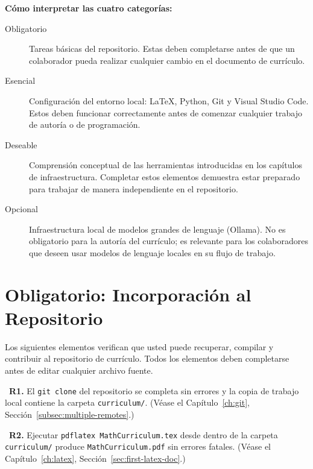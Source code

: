 \begin{Form}
\vs
\noindent
\textbf{Cómo interpretar las cuatro categorías:}

\begin{description}
    \item[Obligatorio] Tareas básicas del repositorio. Estas deben
          completarse antes de que un colaborador pueda realizar
          cualquier cambio en el documento de currículo.
    \item[Esencial] Configuración del entorno local: \LaTeX{}, Python,
          Git y Visual Studio Code. Estos deben funcionar
          correctamente antes de comenzar cualquier trabajo de autoría
          o de programación.
    \item[Deseable] Comprensión conceptual de las herramientas
          introducidas en los capítulos de infraestructura. Completar
          estos elementos demuestra estar preparado para trabajar de
          manera independiente en el repositorio.
    \item[Opcional] Infraestructura local de modelos grandes de
          lenguaje (Ollama). No es obligatorio para la autoría del
          currículo; es relevante para los colaboradores que deseen
          usar modelos de lenguaje locales en su flujo de trabajo.
\end{description}
\vs

\section{Obligatorio: Incorporación al Repositorio}
\label{sec:assess-required}

Los siguientes elementos verifican que usted puede recuperar,
compilar y contribuir al repositorio de currículo. Todos los
elementos deben completarse antes de editar cualquier archivo fuente.

\vs

\noindent\CheckBox[name=r1,width=0.4cm,height=0.4cm]{}~\textbf{R1.}
El \texttt{git clone} del repositorio se completa sin errores y la
copia de trabajo local contiene la carpeta \texttt{curriculum/}.
(Véase el Capítulo~\ref{ch:git}, Sección~\ref{subsec:multiple-remotes}.)

\vs

\noindent\CheckBox[name=r2,width=0.4cm,height=0.4cm]{}~\textbf{R2.}
Ejecutar \texttt{pdflatex MathCurriculum.tex} desde dentro de la
carpeta \texttt{curriculum/} produce \texttt{MathCurriculum.pdf}
sin errores fatales.
(Véase el Capítulo~\ref{ch:latex}, Sección~\ref{sec:first-latex-doc}.)


\end{Form}
